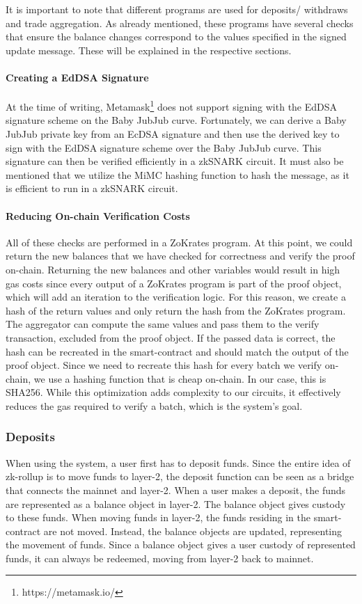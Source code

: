 \documentclass[../../thesis.tex]{subfiles}
\begin{document}
It is important to note that different programs are used for deposits/ withdraws and trade aggregation. As already mentioned, these programs have several checks that ensure the balance changes correspond to the values specified in the signed update message. These will be explained in the respective sections. 

\paragraph{Creating a EdDSA Signature} \label{signature}
At the time of writing, Metamask\footnote{https://metamask.io/} does not support signing with the EdDSA signature scheme on the Baby JubJub curve. Fortunately, we can derive a Baby JubJub private key from an EcDSA signature and then use the derived key to sign with the EdDSA signature scheme over the Baby JubJub curve. This signature can then be verified efficiently in a zkSNARK circuit. It must also be mentioned that we utilize the MiMC hashing function to hash the message, as it is efficient to run in a zkSNARK circuit.

\paragraph{Reducing On-chain Verification Costs} \label{exec_and_reduce}
All of these checks are performed in a ZoKrates program. At this point, we could return the new balances that we have checked for correctness and verify the proof on-chain. Returning the new balances and other variables would result in high gas costs since every output of a ZoKrates program is part of the proof object, which will add an iteration to the verification logic. For this reason, we create a hash of the return values and only return the hash from the ZoKrates program. The aggregator can compute the same values and pass them to the verify transaction, excluded from the proof object. If the passed data is correct, the hash can be recreated in the smart-contract and should match the output of the proof object. Since we need to recreate this hash for every batch we verify on-chain, we use a hashing function that is cheap on-chain. In our case, this is SHA256. While this optimization adds complexity to our circuits, it effectively reduces the gas required to verify a batch, which is the system's goal.

\subsubsection{Deposits}
When using the system, a user first has to deposit funds. Since the entire idea of zk-rollup is to move funds to layer-2, the deposit function can be seen as a bridge that connects the mainnet and layer-2. When a user makes a deposit, the funds are represented as a balance object in layer-2. The balance object gives custody to these funds. When moving funds in layer-2, the funds residing in the smart-contract are not moved. Instead, the balance objects are updated, representing the movement of funds. Since a balance object gives a user custody of represented funds, it can always be redeemed, moving from layer-2 back to mainnet. 
\end{document}
